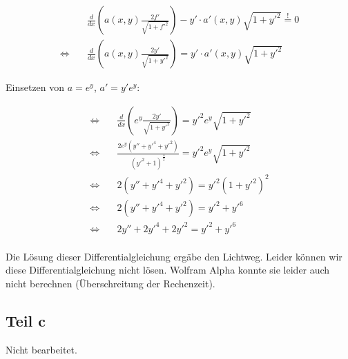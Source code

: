 \documentclass[a4paper,german,12pt,smallheadings]{scrartcl}
\begin{document}
\begin{align*}
  &\frac{d}{dx} \left(a(x,y) \frac{2f'}{\sqrt{1+f'^2}} \right) - y' \cdot a'(x, y) \sqrt{1+y'^2} \overset{!}{=} 0 \\
  \Leftrightarrow \quad &\frac{d}{dx} \left(a(x,y) \frac{2y'}{\sqrt{1+y'^2}} \right) = y' \cdot a'(x, y) \sqrt{1+y'^2}
\end{align*}

Einsetzen von $a = e^y$, $a' = y' e^y$:

\begin{align*}
  \Leftrightarrow \quad &\frac{d}{dx} \left(e^y \frac{2y'}{\sqrt{1+y'^2}} \right) = y'^2 e^y \sqrt{1+y'^2} \\
  \Leftrightarrow \quad &\frac{2e^y(y''+y'^4+y'^2)}{(y'^2+1)^\frac{3}{2}}= y'^2 e^y \sqrt{1+y'^2} \\
  \Leftrightarrow \quad &2(y''+y'^4+y'^2)= y'^2 (1+y'^2)^2\\
  \Leftrightarrow \quad &2(y''+y'^4+y'^2)= y'^2+y'^6\\
  \Leftrightarrow \quad &2y''+2y'^4+2y'^2= y'^2+y'^6\\
\end{align*}

Die Lösung dieser Differentialgleichung ergäbe den Lichtweg. Leider können wir
diese Differentialgleichung nicht lösen. Wolfram Alpha konnte sie leider auch
nicht berechnen (Überschreitung der Rechenzeit).

\subsection*{Teil c}
Nicht bearbeitet.
\end{document}
